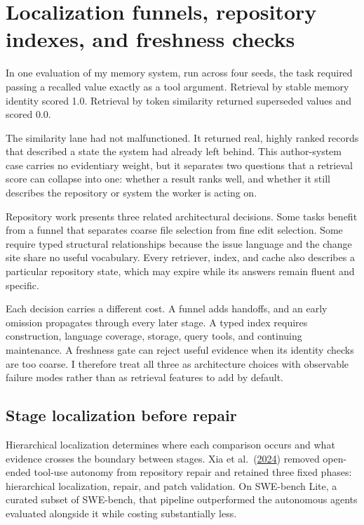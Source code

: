 \chapter{Localization funnels, repository indexes, and freshness checks}
\label{ch12-localization-funnels-repository-indexes-freshness-checks}
In one evaluation of my memory system, run across four seeds, the task required passing a recalled value exactly as a tool argument. Retrieval by stable memory identity scored 1.0. Retrieval by token similarity returned superseded values and scored 0.0.

The similarity lane had not malfunctioned. It returned real, highly ranked records that described a state the system had already left behind. This author-system case carries no evidentiary weight, but it separates two questions that a retrieval score can collapse into one: whether a result ranks well, and whether it still describes the repository or system the worker is acting on.

Repository work presents three related architectural decisions. Some tasks benefit from a funnel that separates coarse file selection from fine edit selection. Some require typed structural relationships because the issue language and the change site share no useful vocabulary. Every retriever, index, and cache also describes a particular repository state, which may expire while its answers remain fluent and specific.

Each decision carries a different cost. A funnel adds handoffs, and an early omission propagates through every later stage. A typed index requires construction, language coverage, storage, query tools, and continuing maintenance. A freshness gate can reject useful evidence when its identity checks are too coarse. I therefore treat all three as architecture choices with observable failure modes rather than as retrieval features to add by default.

\section{Stage localization before repair}\label{stage-localization-before-repair}

Hierarchical localization determines where each comparison occurs and what evidence crosses the boundary between stages. Xia et al.~(\href{https://arxiv.org/abs/2407.01489}{2024}) removed open-ended tool-use autonomy from repository repair and retained three fixed phases: hierarchical localization, repair, and patch validation. On SWE-bench Lite, a curated subset of SWE-bench, that pipeline outperformed the autonomous agents evaluated alongside it while costing substantially less.

